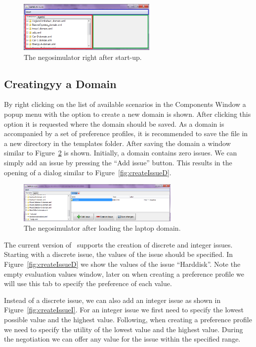 \documentclass[]{article}
\begin{document}
\begin{figure}[htb]
	\centering
	\includegraphics[width=0.6\textwidth]{media/image6.png}
\caption{The negosimulator right after start-up.}\label{Fig:negosimulator start}
\end{figure}

\subsection{Creatingyy a Domain}
By right clicking on the list of available scenarios in the Components Window a popup menu with the option to create a new domain is shown. After clicking this option it is requested where the domain should be saved. As a domain is accompanied by a set of preference profiles, it is recommended to save the file in a new directory in the templates folder. After saving the domain a window similar to Figure~\ref{Fig:newdomain} is shown. Initially, a domain contains zero issues. We can simply add an issue by pressing the ``Add issue'' button. This results in the opening of a dialog similar to Figure~\ref{fig:createIssueD}.

\begin{figure}[htb]
	\centering
	\includegraphics[width=0.7\textwidth]{media/image7.png}
\caption{The negosimulator after loading the laptop domain.}\label{Fig:newdomain}
\end{figure}

The current version of \Genius~supports the creation of discrete and integer issues. Starting with a discrete issue, the values of the issue should be specified. In Figure~\ref{fig:createIssueD} we show the values of the issue ``Harddisk''. Note the empty evaluation values window, later on when creating a preference profile we will use this tab to specify the preference of each value.

Instead of a discrete issue, we can also add an integer issue as shown in Figure~\ref{fig:createIssueI}. For an integer issue we first need to specify the lowest possible value and the highest value. Following, when creating a preference profile we need to specify the utility of the lowest value and the highest value. During the negotiation we can offer any value for the issue within the specified range.
\end{document}
